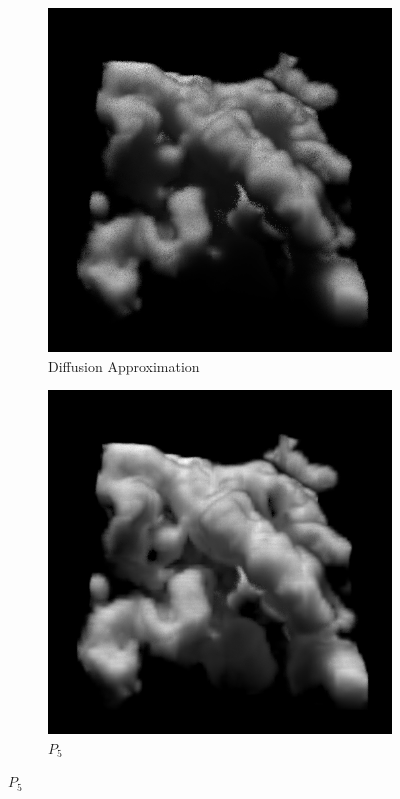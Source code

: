 \begin{figure}[h]
\begin{subfigure}[t]{0.48\columnwidth}
\includegraphics[width=\columnwidth]{06_fld/results/nebulae_ms_cda.png}
\caption{Diffusion Approximation}
\label{fig:fld_results_nebulae_3}
\end{subfigure}%
\hspace{0.01\columnwidth}
\begin{subfigure}[t]{0.48\columnwidth}
\includegraphics[width=\columnwidth]{06_fld/results/nebulae_ms_p5.png}
\caption{$P_5$}
\label{fig:fld_results_nebulae_4}
\end{subfigure}


\end{figure}
